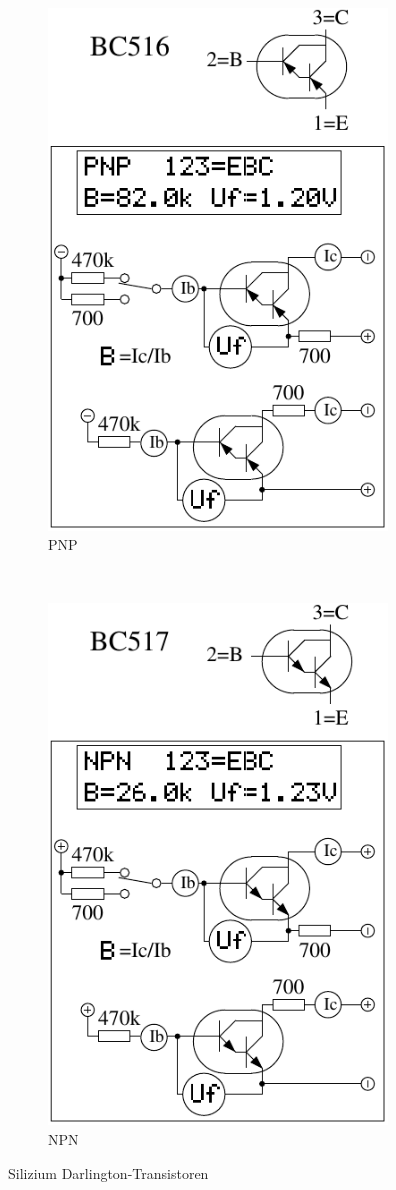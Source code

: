 \begin{figure}[H]
  \begin{subfigure}[b]{9cm}
    \centering
    \includegraphics[width=9cm]{../FIG/BJT_BC516.pdf}
    \caption{PNP}
    \label{fig:BJT-PNP-Darl}
  \end{subfigure}
  ~
  \begin{subfigure}[b]{9cm}
    \centering
    \includegraphics[width=9cm]{../FIG/BJT_BC517.pdf}
    \caption{NPN}
    \label{fig:BJT-NPN-Darl}
  \end{subfigure}
  \caption{Silizium Darlington-Transistoren}
\end{figure}

